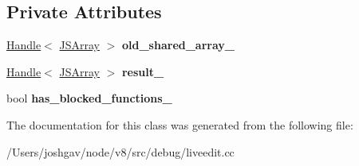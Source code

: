\subsection*{Private Attributes}
\begin{DoxyCompactItemize}
\item 
\hyperlink{classv8_1_1internal_1_1_handle}{Handle}$<$ \hyperlink{classv8_1_1internal_1_1_j_s_array}{J\+S\+Array} $>$ {\bfseries old\+\_\+shared\+\_\+array\+\_\+}\hypertarget{classv8_1_1internal_1_1_inactive_thread_activations_checker_a243201f806695d19d1d6db3616f9c323}{}\label{classv8_1_1internal_1_1_inactive_thread_activations_checker_a243201f806695d19d1d6db3616f9c323}

\item 
\hyperlink{classv8_1_1internal_1_1_handle}{Handle}$<$ \hyperlink{classv8_1_1internal_1_1_j_s_array}{J\+S\+Array} $>$ {\bfseries result\+\_\+}\hypertarget{classv8_1_1internal_1_1_inactive_thread_activations_checker_ae81d7b04d61cdd3ef142955ca6bdbfeb}{}\label{classv8_1_1internal_1_1_inactive_thread_activations_checker_ae81d7b04d61cdd3ef142955ca6bdbfeb}

\item 
bool {\bfseries has\+\_\+blocked\+\_\+functions\+\_\+}\hypertarget{classv8_1_1internal_1_1_inactive_thread_activations_checker_ac45502f0951531f71d5cb544ca002f9d}{}\label{classv8_1_1internal_1_1_inactive_thread_activations_checker_ac45502f0951531f71d5cb544ca002f9d}

\end{DoxyCompactItemize}


The documentation for this class was generated from the following file\+:\begin{DoxyCompactItemize}
\item 
/\+Users/joshgav/node/v8/src/debug/liveedit.\+cc\end{DoxyCompactItemize}
